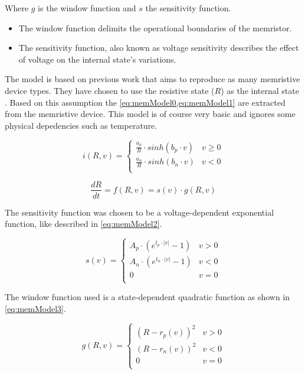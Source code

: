 Where $g$ is the window function and $s$ the sensitivity function.

\begin{itemize}
  \item The window function delimits the operational boundaries of the memristor.
  \item The sensitivity function, also known as voltage sensitivity describes the effect of voltage on the internal state's variations.
\end{itemize}

The model is based on previous work \cite{memCadenceModel} that aims to reproduce as many memristive device types. They have chosen to use the resistive state ($R$) as the internal state \cite{memModelOrigin}. Based on this assumption the \cref{eq:memModel0,eq:memModel1} are extracted from the memristive device. This model is of course very basic and ignores some physical depedencies such as temperature.

\begin{equation}\label{eq:memModel0}
  i(R,v)=
  \begin{cases}
    \frac{a_p}{R}\cdot sinh(b_p\cdot v) & v\ge 0\\
    \frac{a_n}{R}\cdot sinh(b_n\cdot v) & v<0\\
  \end{cases}
\end{equation}

\begin{equation}\label{eq:memModel1}
  \frac{dR}{dt}=f(R,v)=s(v)\cdot g(R,v)
\end{equation}

The sensitivity function was chosen to be a voltage-dependent exponential function, like described in \cref{eq:memModel2}.

\begin{equation}\label{eq:memModel2}
  s(v)=
  \begin{cases}
    A_p\cdot (e^{t_p\cdot |v|}-1)& v>0\\
    A_n\cdot (e^{t_n\cdot |v|}-1)& v<0\\
    0 &  v=0\\
  \end{cases}
\end{equation}

The window function used is a state-dependent quadratic function as shown in \cref{eq:memModel3}.

\begin{equation}\label{eq:memModel3}
  g(R,v)=
  \begin{cases}
    (R-r_p(v))^2& v>0\\
    (R-r_n(v))^2& v<0\\
    0 &  v=0\\
  \end{cases}
\end{equation}

